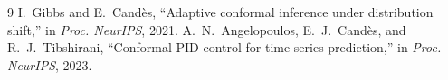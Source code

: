 \documentclass[10pt]{article}
\theoremstyle{remark}
\theoremstyle{definition}
\begin{document}
\begin{thebibliography}{9}
I.~Gibbs and E.~Cand\`es, ``Adaptive conformal inference under distribution shift,''
in \emph{Proc. NeurIPS}, 2021.
A.~N.~Angelopoulos, E.~J.~Cand\`es, and R.~J.~Tibshirani, ``Conformal PID control for time
series prediction,'' in \emph{Proc. NeurIPS}, 2023.
\end{thebibliography}
\end{document}
